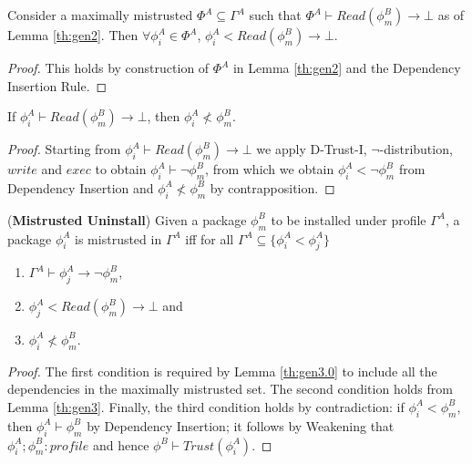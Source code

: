 \documentclass[]{llncs}
\begin{document}
\begin{lemma}\label{th:gen3.0}
Consider a maximally mistrusted $\Phi^{A}\subseteq \Gamma^{A}$ such that $\Phi^{A} \vdash Read(\phi^{B}_{m})\rightarrow \bot$ as of Lemma \ref{th:gen2}. Then $\forall \phi^{A}_{i}\in \Phi^{A}$, $\phi^{A}_{i} < Read(\phi^{B}_{m})\rightarrow \bot$.
\end{lemma}

\begin{proof}
This holds by construction of $\Phi^{A}$ in Lemma \ref{th:gen2} and the Dependency Insertion Rule.
\end{proof}




\begin{lemma}\label{th:gen3}
	If $\phi^{A}_{i}\vdash Read(\phi^{B}_{m})\rightarrow \bot$, then $ \phi^{A}_{i}\nless \phi_{m}^{B}$.
\end{lemma}

\begin{proof}
Starting from $\phi^{A}_{i}\vdash Read(\phi^{B}_{m})\rightarrow \bot$ we apply D-Trust-I, $\neg$-distribution, $write$ and  $exec$ to obtain $\phi^{A}_{i}\vdash \neg \phi^{B}_{m}$, from which we obtain $\phi^{A}_{i}< \neg \phi^{B}_{m}$ from Dependency Insertion and $\phi^{A}_{i}\nless \phi^{B}_{m}$ by contrapposition.

\end{proof}





\begin{theorem}(\textbf{Mistrusted Uninstall})
	Given a package $\phi^{B}_{m}$ to be installed under profile $\Gamma^{A}$, a package $\phi^{A}_{i}$ is mistrusted in $\Gamma^{A}$ iff for all $\Gamma^{A}\subseteq\{\phi^{A}_{i}< \phi^{A}_{j}\}$

	\begin{enumerate}
	\item  $\Gamma^{A} \vdash \phi^{A}_{j}\rightarrow \neg \phi^{B}_{m}$,
	\item $\phi^{A}_{j}< Read(\phi^{B}_{m})\rightarrow \bot$ and
	\item $\phi^{A}_{i}\nless \phi^{B}_{m}$.
	\end{enumerate}
\end{theorem}

\begin{proof}
The first condition is required by Lemma \ref{th:gen3.0} to include all the dependencies in the maximally mistrusted set. The second condition holds from Lemma \ref{th:gen3}. Finally, the third condition holds by contradiction: if $\phi^{A}_{i}< \phi^{B}_{m}$, then $\phi^{A}_{i}\vdash \phi^{B}_{m}$ by Dependency Insertion; it follows by Weakening that $\phi^{A}_{i}; \phi^{B}_{m}: profile$ and hence $\phi^{B}\vdash Trust (\phi^{A}_{i})$.
\end{proof}
\end{document}

